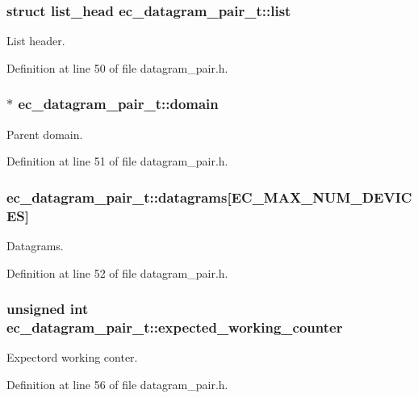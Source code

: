 \subsubsection[{list}]{\setlength{\rightskip}{0pt plus 5cm}struct list\-\_\-head ec\-\_\-datagram\-\_\-pair\-\_\-t\-::list}\label{structec__datagram__pair__t_a8b2eafeceb6565bfe2d0c2363679ba1e}


List header. 



Definition at line 50 of file datagram\-\_\-pair.\-h.

\subsubsection[{domain}]{$\ast$ ec\-\_\-datagram\-\_\-pair\-\_\-t\-::domain}\label{structec__datagram__pair__t_aaaa75d1c846028cdd78be790c82a9e31}


Parent domain. 



Definition at line 51 of file datagram\-\_\-pair.\-h.

\subsubsection[{datagrams}]{ ec\-\_\-datagram\-\_\-pair\-\_\-t\-::datagrams[E\-C\-\_\-\-M\-A\-X\-\_\-\-N\-U\-M\-\_\-\-D\-E\-V\-I\-C\-E\-S]}\label{structec__datagram__pair__t_a3984a280ea726795e9402bc7363d05ed}


Datagrams. 



Definition at line 52 of file datagram\-\_\-pair.\-h.

\subsubsection[{expected\-\_\-working\-\_\-counter}]{\setlength{\rightskip}{0pt plus 5cm}unsigned int ec\-\_\-datagram\-\_\-pair\-\_\-t\-::expected\-\_\-working\-\_\-counter}\label{structec__datagram__pair__t_aa6e12e670f12a511f108b9cd7974f1ce}


Expectord working conter. 



Definition at line 56 of file datagram\-\_\-pair.\-h.

